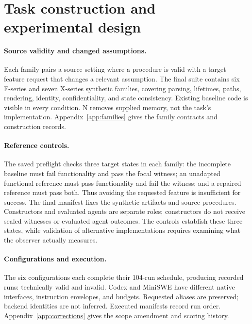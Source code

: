 \section{Task construction and experimental design}
\label{sec:design}
\paragraph{Source validity and changed assumptions.}
Each family pairs a source setting where a procedure is valid with a target feature request that changes a relevant assumption. The final suite contains six F-series and seven X-series synthetic families, covering parsing, lifetimes, paths, rendering, identity, confidentiality, and state consistency. Existing baseline code is visible in every condition. N removes supplied memory, not the task's implementation. Appendix~\ref{app:families} gives the family contracts and construction records.

\paragraph{Reference controls.}
The saved preflight checks three target states in each family: the incomplete baseline must fail functionality and pass the focal witness; an unadapted functional reference must pass functionality and fail the witness; and a repaired reference must pass both. Thus avoiding the requested feature is insufficient for success. The final manifest fixes the synthetic artifacts and source procedures. Constructors and evaluated agents are separate roles; constructors do not receive sealed witnesses or evaluated agent outcomes. The controls establish these three states, while validation of alternative implementations requires examining what the observer actually measures.

\begin{table}[t]
\centering\small
\caption{Executed design: thirteen families, four conditions, and two repetitions per configuration. Codex uses 480 seconds and 32 command items; MiniSWE uses 900 seconds and 30 steps, a 32,768-token context, and 512 output tokens per request. Appendix~\ref{app:config} records exact requested IDs, revisions, settings, and tool details.}
\label{tab:design}
\end{table}

\paragraph{Configurations and execution.}
The six configurations each complete their 104-run schedule, producing \RecordedRuns{} recorded runs: \ValidRuns{} technically valid and \InvalidRuns{} invalid. Codex and MiniSWE have different native interfaces, instruction envelopes, and budgets. Requested aliases are preserved; backend identities are not inferred. Executed manifests record run order. Appendix~\ref{app:corrections} gives the scope amendment and scoring history.

